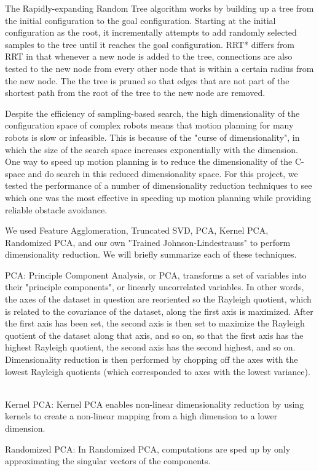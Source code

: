 \documentclass[12pt]{article}
\begin{document}
The Rapidly-expanding Random Tree algorithm works by building up a tree from the initial configuration to the goal configuration. Starting at the initial configuration as the root, it incrementally attempts to add randomly selected samples to the tree until it reaches the goal configuration. RRT* differs from RRT in that whenever a new node is added to the tree, connections are also tested to the new node from every other node that is within a certain radius from the new node. The the tree is pruned so that edges that are not part of the shortest path from the root of the tree to the new node are removed. 

Despite the efficiency of sampling-based search, the high dimensionality of the
configuration space of complex robots means that motion planning for many
robots is slow or infeasible. This is because of the "curse of dimensionality",
in which the size of the search space increases exponentially with the
dimension. One way to speed up motion planning is to reduce the dimensionality
of the C-space and do search in this reduced dimensionality space. For this
project, we tested the performance of a number of dimensionality reduction
techniques to see which one was the most effective in speeding up motion
planning while providing reliable obstacle avoidance.

We used Feature Agglomeration, Truncated SVD, PCA, Kernel PCA, Randomized PCA, and
our own "Trained Johnson-Lindestrauss" to perform dimensionality reduction. We will briefly summarize each of these techniques.

PCA: Principle Component Analysis, or PCA, transforms a set of variables into 
their "principle components", or linearly uncorrelated variables. In other words, the axes of the dataset in question are reoriented so the Rayleigh quotient, which is related to the covariance of the dataset, along the first axis is maximized. After the first axis has been set, the second axis is then set to maximize the Rayleigh quotient of the dataset along that axis, and so on, so that the first axis has the highest Rayleigh quotient, the second axis has the second highest, and so on. Dimensionality reduction is then performed by chopping off the axes with the lowest Rayleigh quotients (which corresponded to axes with the lowest variance). \

Kernel PCA: Kernel PCA enables non-linear dimensionality reduction by using kernels to create a non-linear mapping from a high dimension to a lower dimension.

Randomized PCA: In Randomized PCA, computations are sped up by only approximating the singular vectors of the components.
\end{document}
